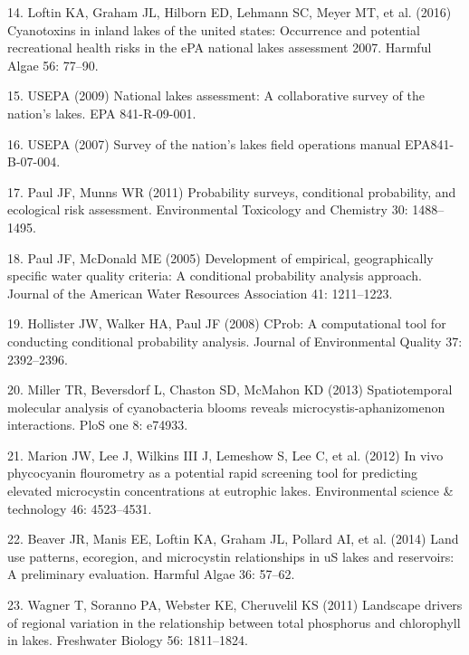 \documentclass[11pt,]{article}
\begin{document}
\hypertarget{ref-loftin2016cyanotoxins}{}
14. Loftin KA, Graham JL, Hilborn ED, Lehmann SC, Meyer MT, et al.
(2016) Cyanotoxins in inland lakes of the united states: Occurrence and
potential recreational health risks in the ePA national lakes assessment
2007. Harmful Algae 56: 77--90.

\hypertarget{ref-usepa2009national}{}
15. USEPA (2009) National lakes assessment: A collaborative survey of
the nation's lakes. EPA 841-R-09-001.

\hypertarget{ref-nlaux5ffieldops}{}
16. USEPA (2007) Survey of the nation's lakes field operations manual
EPA841-B-07-004.

\hypertarget{ref-paul2011probability}{}
17. Paul JF, Munns WR (2011) Probability surveys, conditional
probability, and ecological risk assessment. Environmental Toxicology
and Chemistry 30: 1488--1495.

\hypertarget{ref-paul2005development}{}
18. Paul JF, McDonald ME (2005) Development of empirical, geographically
specific water quality criteria: A conditional probability analysis
approach. Journal of the American Water Resources Association 41:
1211--1223.

\hypertarget{ref-hollister2008cprob}{}
19. Hollister JW, Walker HA, Paul JF (2008) CProb: A computational tool
for conducting conditional probability analysis. Journal of
Environmental Quality 37: 2392--2396.

\hypertarget{ref-miller2013spatiotemporal}{}
20. Miller TR, Beversdorf L, Chaston SD, McMahon KD (2013)
Spatiotemporal molecular analysis of cyanobacteria blooms reveals
microcystis-aphanizomenon interactions. PloS one 8: e74933.

\hypertarget{ref-marion2012vivo}{}
21. Marion JW, Lee J, Wilkins III J, Lemeshow S, Lee C, et al. (2012) In
vivo phycocyanin flourometry as a potential rapid screening tool for
predicting elevated microcystin concentrations at eutrophic lakes.
Environmental science \& technology 46: 4523--4531.

\hypertarget{ref-beaver2014land}{}
22. Beaver JR, Manis EE, Loftin KA, Graham JL, Pollard AI, et al. (2014)
Land use patterns, ecoregion, and microcystin relationships in uS lakes
and reservoirs: A preliminary evaluation. Harmful Algae 36: 57--62.

\hypertarget{ref-wagner2011landscape}{}
23. Wagner T, Soranno PA, Webster KE, Cheruvelil KS (2011) Landscape
drivers of regional variation in the relationship between total
phosphorus and chlorophyll in lakes. Freshwater Biology 56: 1811--1824.
\end{document}
